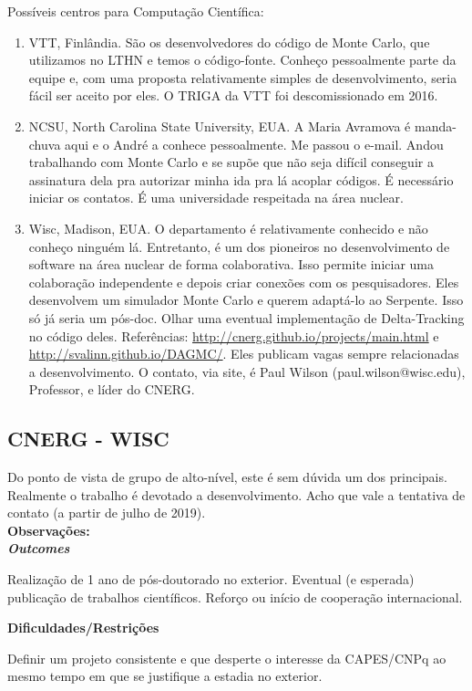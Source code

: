 Possíveis centros para Computação Científica:
\begin{enumerate}
	\item VTT, Finlândia. São os desenvolvedores do código de Monte Carlo, que utilizamos no LTHN e temos o código-fonte. Conheço pessoalmente parte da equipe e, 
	com uma proposta relativamente simples de desenvolvimento, seria fácil ser aceito por eles. O TRIGA da VTT foi descomissionado em 2016.
	\item NCSU, North Carolina State University, EUA. A Maria Avramova é manda-chuva aqui e o André a conhece pessoalmente. Me passou o e-mail. Andou trabalhando com Monte Carlo e se supõe que não seja difícil conseguir a assinatura dela pra autorizar minha ida pra lá acoplar códigos. É necessário iniciar os contatos. É uma universidade respeitada na área nuclear.
	\item Wisc, Madison, EUA. O departamento é relativamente conhecido e não conheço ninguém lá. Entretanto, é um dos pioneiros no desenvolvimento de software na área nuclear de forma colaborativa. Isso permite iniciar uma colaboração independente e depois criar conexões com os pesquisadores. Eles desenvolvem um simulador Monte Carlo e querem adaptá-lo ao Serpente. Isso só já seria um pós-doc. Olhar uma eventual implementação de Delta-Tracking no código deles. Referências: \url{http://cnerg.github.io/projects/main.html} e \url{http://svalinn.github.io/DAGMC/}. Eles publicam vagas sempre relacionadas a desenvolvimento. O contato, via site, é Paul Wilson (paul.wilson@wisc.edu), Professor, e líder do CNERG.
	
\end{enumerate}

\subsection{CNERG - WISC}
	Do ponto de vista de grupo de alto-nível, este é sem dúvida um dos principais. Realmente o trabalho é devotado a desenvolvimento. Acho que vale a tentativa de contato (a partir de julho de 2019).
\\


\textbf{Observações:}
\\


\textbf{\textit{Outcomes}}

Realização de 1 ano de pós-doutorado no exterior. Eventual (e esperada) publicação 
de trabalhos científicos. Reforço ou início de cooperação internacional.

\textbf{Dificuldades/Restrições}

Definir um projeto consistente e que desperte o interesse da CAPES/CNPq ao mesmo 
tempo em que se justifique a estadia no exterior.


